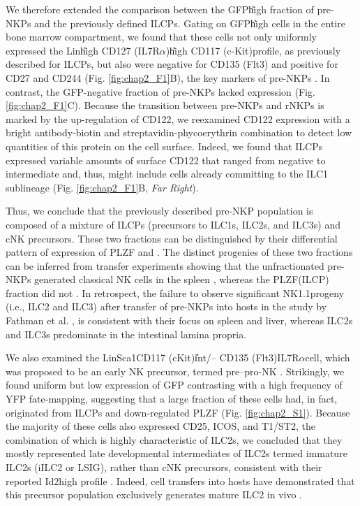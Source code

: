 We therefore extended the comparison between the GFP\U{high} fraction of pre-NKPs and the previously defined ILCPs. Gating on GFP\U{high} cells in the entire bone marrow compartment, we found that these cells not only uniformly expressed the Lin\UM \ab\U{high} CD127 (IL7R$\alpha$)\U{high} CD117 (c-Kit)\UP profile, as previously described for ILCPs, but also were negative for CD135 (Flt3) and positive for CD27 and CD244 (Fig. \ref{fig:chap2_F1}B), the key markers of pre-NKPs \cite{fathman2011}. In contrast, the GFP-negative fraction of pre-NKPs lacked \ab{} expression (Fig. \ref{fig:chap2_F1}C). Because the transition between pre-NKPs and rNKPs is marked by the up-regulation of CD122, we reexamined CD122 expression with a bright antibody-biotin and streptavidin-phycoerythrin combination to detect low quantities of this protein on the cell surface. Indeed, we found that ILCPs expressed variable amounts of surface CD122 that ranged from negative to intermediate and, thus, might include cells already committing to the ILC1 sublineage (Fig. \ref{fig:chap2_F1}B, \textit{Far Right}).

Thus, we conclude that the previously described pre-NKP population is composed of a mixture of ILCPs (precursors to ILC1s, ILC2s, and ILC3s) and cNK precursors. These two fractions can be distinguished by their differential pattern of expression of PLZF and \ab. The distinct progenies of these two fractions can be inferred from transfer experiments showing that the unfractionated pre-NKPs generated classical NK cells in the spleen \cite{fathman2011}, whereas the PLZF\UP \ab\UP (ILCP) fraction did not \cite{constantinides2014}. In retrospect, the failure to observe significant NK1.1\UM progeny (i.e., ILC2 and ILC3) after transfer of pre-NKPs into \Ragrg hosts in the study by Fathman et al. \cite{fathman2011}, is consistent with their focus on spleen and liver, whereas ILC2s and ILC3s predominate in the intestinal lamina propria.

We also examined the Lin\UM Sca1\UP CD117 (cKit)\U{int/--} CD135 (Flt3)\UM IL7R$\alpha$\UP cell, which was proposed to be an early NK precursor, termed pre–pro-NK \cite{carotta2011}. Strikingly, we found uniform but low expression of GFP contrasting with a high frequency of YFP fate-mapping, suggesting that a large fraction of these cells had, in fact, originated from ILCPs and down-regulated PLZF (Fig. \ref{fig:chap2_S1}). Because the majority of these cells also expressed CD25, ICOS, and T1/ST2, the combination of which is highly characteristic of ILC2s, we concluded that they mostly represented late developmental intermediates of ILC2s termed immature ILC2s (iILC2 or LSIG), rather than cNK precursors, consistent with their reported Id2high profile \cite{hoyler2012}. Indeed, cell transfers into \Ragrg hosts have demonstrated that this precursor population exclusively generates mature ILC2 in vivo \cite{hoyler2012}.

